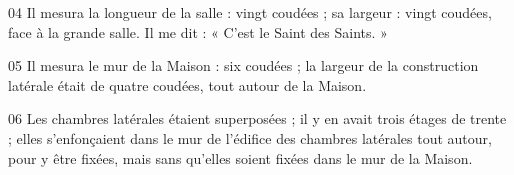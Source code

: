 
04 Il mesura la longueur de la salle : vingt coudées ; sa largeur : vingt coudées, face à la grande salle. Il me dit : « C’est le Saint des Saints. »

05 Il mesura le mur de la Maison : six coudées ; la largeur de la construction latérale était de quatre coudées, tout autour de la Maison.

06 Les chambres latérales étaient superposées ; il y en avait trois étages de trente ; elles s’enfonçaient dans le mur de l’édifice des chambres latérales tout autour, pour y être fixées, mais sans qu’elles soient fixées dans le mur de la Maison.
